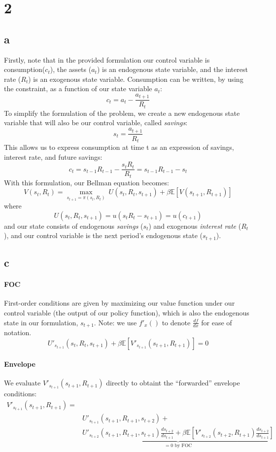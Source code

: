 \documentclass[a4paper,12pt]{article}
\begin{document}
\section*{2}
\subsection*{a}
Firstly, note that in the provided formulation our control variable is consumption($c_t$), the assets ($a_t$) is an endogenous state variable, and the interest rate ($R_t$) is an exogenous state variable. Consumption can be written, by using the constraint, as a function of our state variable $a_t$:
%
$$
c_t = a_t - \frac{a_{t+1}}{R_t}
$$
%
To simplify the formulation of the problem, we create a new endogenous state variable that will also be our control variable, called \textit{savings}:
%
$$
s_{t} = \frac{a_{t+1}}{R_{t}}
$$
%
This allows us to express consumption at time t as an expression of savings, interest rate, and future savings:
%
$$
c_t = s_{t-1}R_{t-1} - \frac{s_{t}R_{t}}{R_{t}} = s_{t-1}R_{t-1} - s_{t}
$$
%
With this formulation, our Bellman equation becomes:
%
$$
V(s_t, R_t) = \max_{s_{t+1} = \pi (s_t, R_t)} \ U(s_t, R_t, s_{t+1}) + \beta \mathbb{E}[ V(s_{t+1}, R_{t+1})]
$$
%
where
%
$$
U(s_t, R_t, s_{t+1}) = u(s_tR_t - s_{t+1}) = u(c_{t+1})
$$
%
and our state consists of endogenous \textit{savings} ($s_t$) and exogenous \textit{interest rate} ($R_t$), and our control variable is the next period's endogenous state ($s_{t+1}$).

\subsection*{c}

\paragraph{FOC} First-order conditions are given by maximizing our value function under our control variable (the output of our policy function), which is also the endogenous state in our formulation, $s_{t+1}$. Note: we use $f'_{x}()$ to denote $\frac{df}{dx}$ for ease of notation.
%
$$
U'_{s_{t+1}}(s_t, R_t, s_{t+1}) + \beta \mathbb{E} [ V'_{s_{t+1}}(s_{t+1}, R_{t+1})] = 0
$$
%
\paragraph{Envelope} We evaluate $V'_{s_{t+1}}(s_{t+1}, R_{t+1})$ directly to obtaint the ``forwarded'' envelope conditions:
%
\begin{align*}
V'_{s_{t+1}}(s_{t+1}, R_{t+1}) =& \\
&U'_{s_{t+1}}(s_{t+1}, R_{t+1}, s_{t+2}) + \\
&\underbrace{U'_{s_{t+2}}(s_{t+1}, R_{t+1}, s_{t+1})\frac{ds_{t+2}}{ds_{t+1}} + \beta \mathbb{E} [ V'_{s_{t+2}}(s_{t+2}, R_{t+1})\frac{ds_{t+2}}{ds_{t+1}}]}_{= 0 \text{ by FOC}}
\end{align*}
%
\end{document}
